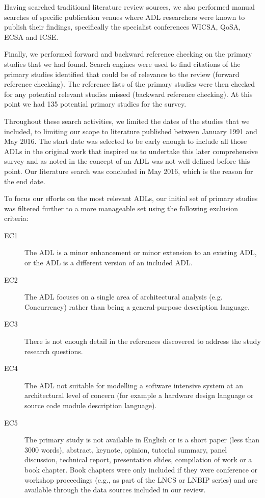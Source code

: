 Having searched traditional literature review sources, we also performed manual searches of specific publication venues where ADL researchers were known to publish their findings, specifically the specialist conferences WICSA, QoSA, ECSA and ICSE.

Finally, we performed forward and backward reference checking on the primary studies that we had found. Search engines were used to find citations of the primary studies identified that could be of relevance to the review (forward reference checking). The reference lists of the primary studies were then checked for any potential relevant studies missed (backward reference checking). At this point we had 135 potential primary studies for the survey.

Throughout these search activities, we limited the dates of the studies that we included, to limiting our scope to literature published between January 1991 and May 2016. The start date was selected to be early enough to include all those ADLs in the original work \cite{medvidovic2000-adlcomparison} that inspired us to undertake this later comprehensive survey and as noted in \cite{malavolta2013-industryadlneeds} the concept of an ADL was not well defined before this point.  Our literature search was concluded in May 2016, which is the reason for the end date.

To focus our efforts on the most relevant ADLs, our initial set of primary studies was filtered further to a more manageable set using the following exclusion criteria:

\begin{description}
\item[EC1] The ADL is a minor enhancement or minor extension to an existing ADL, or the ADL is a different version of an included ADL.
\item[EC2] The ADL focuses on a single area of architectural analysis (e.g. Concurrency) rather than being a general-purpose description language.
\item[EC3] There is not enough detail in the references discovered to address the study research questions.
\item[EC4] The ADL not suitable for modelling a software intensive system at an architectural level of concern (for example a hardware design language or source code module description language).
\item[EC5] The primary study is not available in English or is a short paper (less than 3000 words), abstract, keynote, opinion, tutorial summary, panel discussion, technical report, presentation slides, compilation of work or a book chapter. Book chapters were only included if they were conference or workshop proceedings (e.g., as part of the LNCS or LNBIP series) and are available through the data sources included in our review. 
\end{description}

